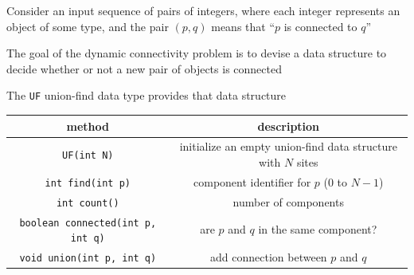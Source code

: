 \documentclass[8pt,a4paper,compress]{beamer}
\begin{document}
\begin{frame}[fragile]
\begin{minipage}{250pt}
\pause

Consider an input sequence of pairs of integers, where each integer represents an object of some type, and the pair $(p, q)$ means that ``$p$ is connected to $q$''

\pause
\bigskip

The goal of the dynamic connectivity problem is to devise a data structure to decide whether or not a new pair of objects is connected 

\pause
\bigskip

The \lstinline{UF} union-find data type provides that data structure

\begin{center}
\begin{tabular}{cc}
method & description \\ \hline
\lstinline$UF(int N)$ & \makecell{initialize an empty union-find data \\ structure with $N$ sites} \\
\lstinline$int find(int p)$ & \makecell{component identifier \\ for $p$ (0 to $N-1$)} \\
\lstinline$int count()$ & number of components \\
\lstinline$boolean connected(int p, int q)$ & are $p$ and $q$ in the same component? \\
\lstinline$void union(int p, int q)$ & add connection between $p$ and $q$
\end{tabular} 
\end{center} 
\end{minipage}%
\begin{minipage}{60pt}

\end{minipage}
\end{frame}
\end{document}
